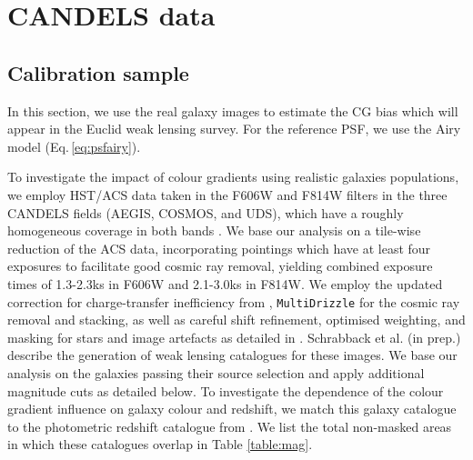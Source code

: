 \documentclass[useAMS,usenatbib]{mn2e}
\begin{document}
\section{CANDELS data}

\subsection{Calibration sample}
In this section, we use the real galaxy images to estimate the CG bias
which will appear in the Euclid weak lensing survey. For the reference
PSF, we use the Airy model (Eq.\,\ref{eq:psfairy}).


To investigate the impact of colour gradients using realistic galaxies
populations, we employ HST/ACS data taken in the F606W and F814W
filters in the three CANDELS fields (AEGIS, COSMOS, and UDS), which have
a roughly homogeneous coverage in both bands
\citep[see][]{davis2007,grogin2011,koekemoer11}. We base our analysis
on a tile-wise reduction of the ACS data, incorporating pointings
which have at least four exposures to facilitate good cosmic ray
removal, yielding combined exposure times of 1.3-2.3ks in F606W and
2.1-3.0ks in F814W.  We employ the updated correction for
charge-transfer inefficiency from \cite{massey2014},
\texttt{MultiDrizzle} \citep{koekemoer2003} for the cosmic ray removal
and stacking, as well as careful shift refinement, optimised
weighting, and masking for stars and image artefacts as detailed in
\cite{schrabback2010}.  Schrabback et al. (in prep.) describe the
generation of weak lensing catalogues for these images.  We base our
analysis on the galaxies passing their source selection and apply
additional magnitude cuts as detailed below. To investigate the
dependence of the colour gradient influence on galaxy colour and
redshift, we match this galaxy catalogue to the photometric redshift
catalogue from \cite{skelton14}.  We list the total non-masked areas
in which these catalogues overlap in Table \ref{table:mag}.
\end{document}
